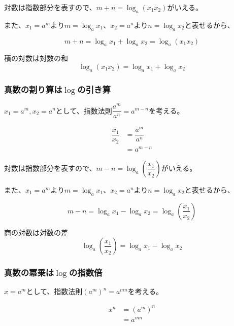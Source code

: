 \documentclass[16pt,b5paper]{book}
\begin{document}
対数は指数部分を表すので、$m+n = \log_a (x_1x_2)$がいえる。

また、$x_1 = a^m$より$m = \log_a x_1$、$x_2 = a^n$より$n = \log_a x_2$と表せるから、

\begin{equation}
  m + n = \log_a x_1 + \log_a x_2 = \log_a (x_1x_2)
\end{equation}

\begin{theorem}{積の対数は対数の和}
  \LARGE
  \begin{equation}
    \log_a (x_1x_2) = \log_a x_1 + \log_a x_2
  \end{equation}
\end{theorem}

\subsubsection{真数の割り算は$\log$の引き算}

$x_1 = a^m, x_2 = a^n$として、指数法則$\dfrac{a^m}{a^n} = a^{m-n}$を考える。

\begin{align}
  \dfrac{x_1}{x_2} & = \dfrac{a^m}{a^n} \\
                   & = a^{m-n}
\end{align}

対数は指数部分を表すので、$m-n = \log_a \left( \dfrac{x_1}{x_2} \right)$がいえる。

また、$x_1 = a^m$より$m = \log_a x_1$、$x_2 = a^n$より$n = \log_a x_2$と表せるから、

\begin{equation}
  m - n = \log_a x_1 - \log_a x_2 = \log_a \left( \dfrac{x_1}{x_2} \right)
\end{equation}

\begin{theorem}{商の対数は対数の差}
  \LARGE
  \begin{equation}
    \log_a \left( \dfrac{x_1}{x_2} \right) = \log_a x_1 - \log_a x_2
  \end{equation}
\end{theorem}

\subsubsection{真数の冪乗は$\log$の指数倍}

$x = a^m$として、指数法則$(a^m)^n = a^{mn}$を考える。

\begin{align}
  x^n & = (a^m)^n \\
      & = a^{mn}
\end{align}
\end{document}
